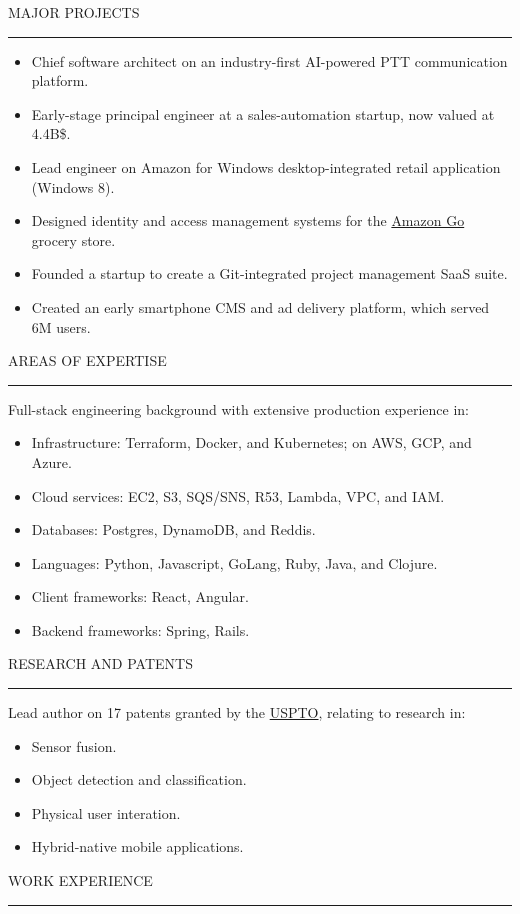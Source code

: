 \documentclass[12pt]{article}
\newcommand{\blockseparation}{\vspace{0.13in}}
\newcommand{\heading}[1]{
	\vspace{0.05in}
	\uppercase{#1}
	\vspace{0.05in}
	\hrule
	\blockseparation
}
\newcommand{\bulletheading}[1]{
	\vspace{0.075in}
	\hspace{0.1in}
	{#1}
	\vspace{0.03in}
}
\newenvironment{tightbullets}
{\begin{itemize}}
{\end{itemize}}
\newenvironment{bullets}
{\begin{tightbullets}}
{\end{tightbullets} \blockseparation}
\begin{document}
\begin{flushleft}
\heading{Major Projects}
\begin{bullets}
	\item Chief software architect on an industry-first AI-powered PTT communication platform.
	\item Early-stage principal engineer at a sales-automation startup, now valued at 4.4B\$.
	\item Lead engineer on Amazon for Windows desktop-integrated retail application (Windows 8).
	\item Designed identity and access management systems for the \href{https://www.amazon.com/b?ie=UTF8\&node=16008589011}{Amazon Go} grocery store.
	\item Founded a startup to create a Git-integrated project management SaaS suite.
	\item Created an early smartphone CMS and ad delivery platform, which served 6M users.
\end{bullets}


\heading{Areas of Expertise}
\bulletheading{Full-stack engineering background with extensive production experience in:}
\begin{bullets}
	\item Infrastructure: Terraform, Docker, and Kubernetes; on AWS, GCP, and Azure.
	\item Cloud services: EC2, S3, SQS/SNS, R53, Lambda, VPC, and IAM.
	\item Databases: Postgres, DynamoDB, and Reddis.
	\item Languages: Python, Javascript, GoLang, Ruby, Java, and Clojure.
	\item Client frameworks: React, Angular.
	\item Backend frameworks: Spring, Rails.
\end{bullets}


\heading{Research and Patents}
\bulletheading{Lead author on 17 patents granted by the \href{https://patents.google.com/?inventor=McNamara+Alexander+Michael}{USPTO}, relating to research in:}
\begin{bullets}
	\item Sensor fusion.
	\item Object detection and classification.
	\item Physical user interation.
	\item Hybrid-native mobile applications.
\end{bullets}

\pagebreak

\heading{Work Experience}
\vspace{0.05in}


\end{flushleft}
\end{document}
